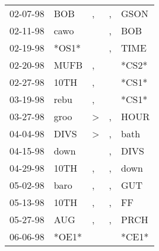 \begin{supertabular}{p{0.07\textwidth}p{0.06\textwidth}p{0.02\textwidth}p{0.02\textwidth}p{0.06\textwidth}}
 02-07-98\textsuperscript{} &   BOB\textsuperscript{} &             , &  , &  GSON\textsuperscript{} \\
 02-11-98\textsuperscript{} &  cawo\textsuperscript{} &               &  , &   BOB\textsuperscript{} \\
 02-19-98\textsuperscript{} &                   *OS1* &               &  , &  TIME\textsuperscript{} \\
 02-20-98\textsuperscript{} &  MUFB\textsuperscript{} &             , &    &                   *CS2* \\
 02-27-98\textsuperscript{} &  10TH\textsuperscript{} &             , &    &                   *CS1* \\
 03-19-98\textsuperscript{} &  rebu\textsuperscript{} &             , &    &                   *CS1* \\
 03-27-98\textsuperscript{} &  groo\textsuperscript{} &  \textgreater &  , &  HOUR\textsuperscript{} \\
 04-04-98\textsuperscript{} &  DIVS\textsuperscript{} &  \textgreater &  , &  bath\textsuperscript{} \\
 04-15-98\textsuperscript{} &  down\textsuperscript{} &               &  , &  DIVS\textsuperscript{} \\
 04-29-98\textsuperscript{} &  10TH\textsuperscript{} &             , &  , &  down\textsuperscript{} \\
 05-02-98\textsuperscript{} &  baro\textsuperscript{} &             , &  , &   GUT\textsuperscript{} \\
 05-13-98\textsuperscript{} &  10TH\textsuperscript{} &             , &  , &    FF\textsuperscript{} \\
 05-27-98\textsuperscript{} &   AUG\textsuperscript{} &             , &  , &  PRCH\textsuperscript{} \\
 06-06-98\textsuperscript{} &                   *OE1* &               &    &                   *CE1* \\
\end{supertabular}
